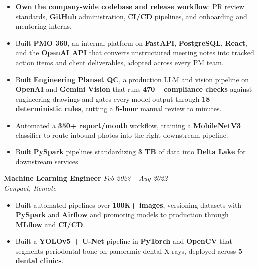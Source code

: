 \documentclass[11pt,letterpaper]{article}
\newcommand{\bulletgap}{2.6pt}   %
\newcommand{\listgap}{3pt}       %
\newcommand{\jobgap}{5pt}        %
\newenvironment{tightlist}{%
\begin{itemize}[
    leftmargin=1.2em,
    itemsep=\bulletgap,
    topsep=\listgap,
    parsep=0pt,
    label={$\bullet$}
]%
}{%
\end{itemize}%
}
\newcommand{\jobentry}[3]{%
\noindent
\colorbox{bandgray}{%
\begin{minipage}{\dimexpr\linewidth-2\fboxsep-2\fboxrule\relax}
\vspace{2pt}
{\bfseries #1} \hfill {\itshape #3}\\[-0.5pt]
{\itshape #2}
\vspace{2pt}
\end{minipage}%
}%
}
\begin{document}
\begin{tightlist}

\item \textbf{Own the company-wide codebase and release workflow}: PR review
standards, \textbf{GitHub} administration, \textbf{CI/CD} pipelines, and
onboarding and mentoring interns.

\item Built \textbf{PMO 360}, an internal platform on \textbf{FastAPI},
\textbf{PostgreSQL}, \textbf{React}, and the \textbf{OpenAI API} that converts
unstructured meeting notes into tracked action items and client deliverables,
adopted across every PM team.

\item Built \textbf{Engineering Planset QC}, a production LLM and vision
pipeline on \textbf{OpenAI} and \textbf{Gemini Vision} that runs
\textbf{470+ compliance checks} against engineering drawings and gates every
model output through \textbf{18 deterministic rules}, cutting a \textbf{5-hour}
manual review to minutes.

\item Automated a \textbf{350+ report/month} workflow, training a
\textbf{MobileNetV3} classifier to route inbound photos into the right
downstream pipeline.

\item Built \textbf{PySpark} pipelines standardizing \textbf{3 TB} of data
into \textbf{Delta Lake} for downstream services.

\end{tightlist}

\vspace{\jobgap}

\jobentry{Machine Learning Engineer}{Genpact, Remote}{Feb 2022 -- Aug 2022}

\begin{tightlist}

\item Built automated pipelines over \textbf{100K+ images}, versioning datasets
with \textbf{PySpark} and \textbf{Airflow} and promoting models to production
through \textbf{MLflow} and \textbf{CI/CD}.

\item Built a \textbf{YOLOv5 + U-Net} pipeline in \textbf{PyTorch} and
\textbf{OpenCV} that segments periodontal bone on panoramic dental X-rays,
deployed across \textbf{5 dental clinics}.

\end{tightlist}
\end{document}
